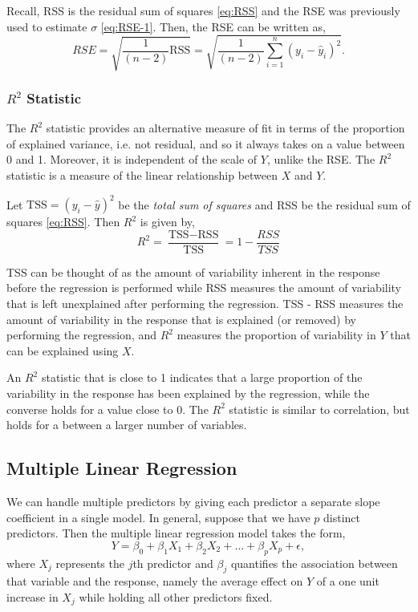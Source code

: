 \documentclass{article}
\numberwithin{equation}{section}
\begin{document}
Recall, RSS is the residual sum of squares \eqref{eq:RSS} and the RSE was previously used to estimate $\sigma$ \eqref{eq:RSE-1}. Then, the RSE can be written as,
\begin{equation}
    RSE = \sqrt{\frac{1}{(n-2)} \text{RSS} } 
    = \sqrt{\frac{1}{(n-2)} \sum_{i=1}^n (y_i - \hat y_i)^2 }.
\end{equation}

\subsubsection*{\texorpdfstring{$R^2$}{R-Squared} Statistic} 
The $R^2$ statistic provides an alternative measure of fit in terms of the proportion of explained variance, i.e. not residual, and so it always takes on a value between 0 and 1. Moreover, it is independent of the scale of $Y$, unlike the RSE. The $R^2$ statistic is a measure of the linear relationship between $X$ and $Y$.

Let $\text{TSS} = (y_i - \hat y)^2$ be the \textit{total sum of squares} and RSS be the residual sum of squares \eqref{eq:RSS}. Then $R^2$ is given by,
\begin{equation}
    R^2 =  \frac{\text{TSS} - \text{RSS}}{\text{TSS}} = 1 - \frac{RSS}{TSS}
\end{equation}

TSS can be thought of as the amount of variability inherent in the response before the regression is performed while RSS measures the amount of variability that is left unexplained after performing the regression. TSS - RSS measures the amount of variability in the response that is explained (or
removed) by performing the regression, and $R^2$ measures the proportion of variability in $Y$ that can be explained using $X$.

An $R^2$ statistic that is close to 1 indicates that a large proportion of the variability in the response has been explained by the regression, while the converse holds for a value close to 0. The $R^2$ statistic is similar to correlation, but holds for a between a larger number of variables.

\subsection{Multiple Linear Regression}
We can handle multiple predictors by giving each predictor a separate slope coefficient in a single model. In general, suppose that we have $p$ distinct predictors. Then the multiple linear regression model takes the form,
\begin{equation}
    Y = \beta_0 + \beta_1 X_1 + \beta_2 X_2 + \dots + \beta_p X_p + \epsilon,
\end{equation}
where $X_j$ represents the $j$th predictor and $\beta_j$ quantifies the association between that variable and the response, namely the average effect on $Y$ of a one unit increase in $X_j$  while holding all other predictors fixed.
\end{document}
